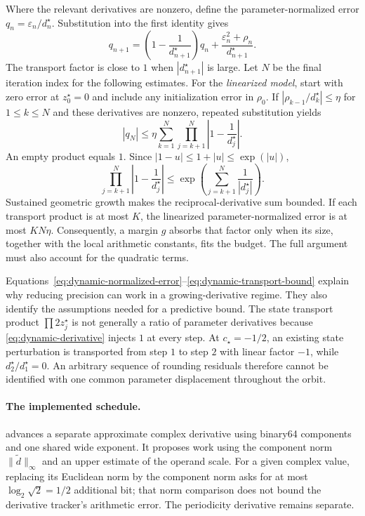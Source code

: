 Where the relevant derivatives are nonzero, define the parameter-normalized
error $q_n=\varepsilon_n/d_n^\star$. Substitution into the first identity gives
\begin{equation}
 q_{n+1}=\left(1-\frac{1}{d_{n+1}^\star}\right)q_n
       +\frac{\varepsilon_n^2+\rho_n}{d_{n+1}^\star}.
 \label{eq:dynamic-normalized-error}
\end{equation}
The transport factor is close to $1$ when $|d_{n+1}^\star|$ is large.
Let $N$ be the final iteration index for the following estimates.
For the \emph{linearized model}, start with zero error at $z_0^\star=0$
and include any initialization error in $\rho_0$. If
$|\rho_{k-1}/d_k^\star|\le\eta$ for $1\le k\le N$ and these derivatives
are nonzero, repeated substitution yields
\begin{equation}
 |q_N|\le\eta\sum_{k=1}^{N}
       \prod_{j=k+1}^{N}\left|1-\frac{1}{d_j^\star}\right|.
 \label{eq:dynamic-linearized-accumulation}
\end{equation}
An empty product equals $1$. Since $|1-u|\le1+|u|\le\exp(|u|)$,
\begin{equation}
 \prod_{j=k+1}^{N}\left|1-\frac{1}{d_j^\star}\right|
 \le\exp\left(\sum_{j=k+1}^{N}\frac{1}{|d_j^\star|}\right).
 \label{eq:dynamic-transport-bound}
\end{equation}
Sustained geometric growth makes the reciprocal-derivative sum bounded.
If each transport product is at most $K$, the linearized parameter-normalized error
is at most $KN\eta$. Consequently, a margin $g$ absorbs that factor only
when its size, together with the local arithmetic constants, fits the
budget. The full argument must also account for the quadratic terms.

Equations~\eqref{eq:dynamic-normalized-error}--\eqref{eq:dynamic-transport-bound}
explain why reducing precision can work in a growing-derivative regime.
They also identify the assumptions needed for a predictive bound. The state
transport product $\prod 2z_j^\star$ is not generally a ratio of parameter
derivatives because \eqref{eq:dynamic-derivative} injects $1$ at every step.
At $c_\star=-1/2$, an existing state perturbation is transported from step
$1$ to step $2$ with linear factor $-1$, while $d_2^\star/d_1^\star=0$.
An arbitrary sequence of rounding residuals therefore cannot be identified
with one common parameter displacement throughout the orbit.

\paragraph{The implemented schedule.}
 advances a separate approximate complex
derivative using binary64 components and one shared wide exponent. It proposes
work using the component norm $\|\widetilde d\|_\infty$ and an upper estimate
of the operand scale. For a given complex value, replacing its Euclidean norm
by the component norm asks for at most $\log_2\sqrt2=1/2$ additional bit;
that norm comparison does not bound the derivative tracker's arithmetic error.
The periodicity derivative remains separate.

